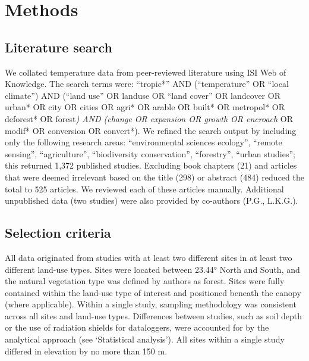 \documentclass[12pt,a4paper,]{report}
\theoremstyle{definition}
\theoremstyle{definition}
\theoremstyle{definition}
\theoremstyle{remark}
\begin{document}
\section{Methods}\label{methods}

\subsection{Literature search}\label{literature-search}

We collated temperature data from peer-reviewed literature using ISI Web
of Knowledge. The search terms were: ``tropic*'' AND (``temperature'' OR
``local climate'') AND (``land use'' OR landuse OR ``land cover'' OR
landcover OR urban* OR city OR cities OR agri* OR arable OR built* OR
metropol* OR deforest* OR forest\emph{) AND (change OR expansion OR
growth OR encroach} OR modif* OR conversion OR convert*). We refined the
search output by including only the following research areas:
``environmental sciences ecology'', ``remote sensing'', ``agriculture'',
``biodiversity conservation'', ``forestry'', ``urban studies''; this
returned 1,372 published studies. Excluding book chapters (21) and
articles that were deemed irrelevant based on the title (298) or
abstract (484) reduced the total to 525 articles. We reviewed each of
these articles manually. Additional unpublished data (two studies) were
also provided by co-authors (P.G., L.K.G.).

\subsection{Selection criteria}\label{selection-criteria}

All data originated from studies with at least two different sites in at
least two different land-use types. Sites were located between 23.44°
North and South, and the natural vegetation type was defined by authors
as forest. Sites were fully contained within the land-use type of
interest and positioned beneath the canopy (where applicable). Within a
single study, sampling methodology was consistent across all sites and
land-use types. Differences between studies, such as soil depth or the
use of radiation shields for dataloggers, were accounted for by the
analytical approach (see `Statistical analysis'). All sites within a
single study differed in elevation by no more than 150 m.
\end{document}
